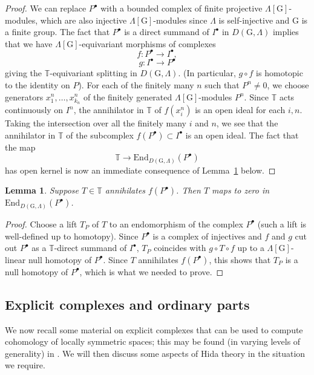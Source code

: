 \documentclass{amsart}
\newtheorem{lemma}[subsubsection]{Lemma}
\theoremstyle{remark}
\numberwithin{equation}{subsection}
\renewcommand{\(}{\left(}
\renewcommand{\)}{\right)}
\begin{document}
\begin{proof} We can replace $P^\bullet$ with a bounded complex of finite projective $\Lambda[\mathrm{G}]$-modules, which are also injective $\Lambda[\mathrm{G}]$-modules since $\Lambda$ is self-injective and $\mathrm{G}$ is a finite group. The fact that $P^\bullet$ is a direct summand of $I^\bullet$ in $D(\mathrm{G},\Lambda)$ implies that we have $\Lambda[\mathrm{G}]$-equivariant morphisms of complexes 
\[
f\colon P^\bullet \to I^\bullet,
\]
\[
g\colon I^\bullet \to P^\bullet
\] 
giving the $\mathbb{T}$-equivariant splitting in $D(\mathrm{G},\Lambda)$. (In particular, $g\circ f$ is homotopic to the identity on $P$). For each of the finitely many $n$ such that $P^n\not=0$, we choose generators $x^n_1, \dots, x^n_{k_n}$ of the finitely generated $\Lambda[\mathrm{G}]$-modules $P^n$. Since $\mathbb{T}$ acts continuously on $I^n$, the annihilator in $\mathbb{T}$ of $f(x^n_i)$ is an open ideal for each $i,n$. Taking the intersection over all the finitely many $i$ and $n$, we see that the annihilator in $\mathbb{T}$ of the subcomplex $f(P^\bullet)\subset I^\bullet$ is an open ideal.  The fact that the map 
\[
\mathbb{T}\to \mathrm{End}_{D(\mathrm{G},\Lambda)}(P^\bullet)
\]
has open kernel is now an immediate consequence of Lemma~\ref{maps to 0} below. 
\end{proof}

\begin{lemma}\label{maps to 0} Suppose $T \in \mathbb{T}$ annihilates $f(P^\bullet)$. Then $T$ maps
to zero in $\mathrm{End}_{D(\mathrm{G},\Lambda)}(P^\bullet)$.
\end{lemma}

\begin{proof} Choose a lift $T_P$ of $T$ to an endomorphism of the complex $P^\bullet$ (such a lift is well-defined up to homotopy). Since $P^\bullet$ is a complex of injectives and $f$ and $g$ cut out $P^\bullet$ as a $\mathbb{T}$-direct summand of $I^\bullet$, $T_P$ coincides with $g \circ T \circ f$ up to a
$\Lambda[\mathrm{G}]$-linear null homotopy of $P^\bullet$. Since $T$ annihilates $f(P^\bullet)$, this shows that $T_P$ is a null homotopy of $P^\bullet$, which is what we needed to prove. 
\end{proof}

\subsection{Explicit complexes and ordinary parts}\label{subsec: ordinary parts} We now recall some material on explicit complexes that can be used to compute cohomology of locally symmetric spaces; this may be found (in varying levels of generality) in \cite{ash-stevens,hansen-thesis,khare-thorne}. We will then discuss some aspects of Hida theory in the situation we require.
\end{document}
